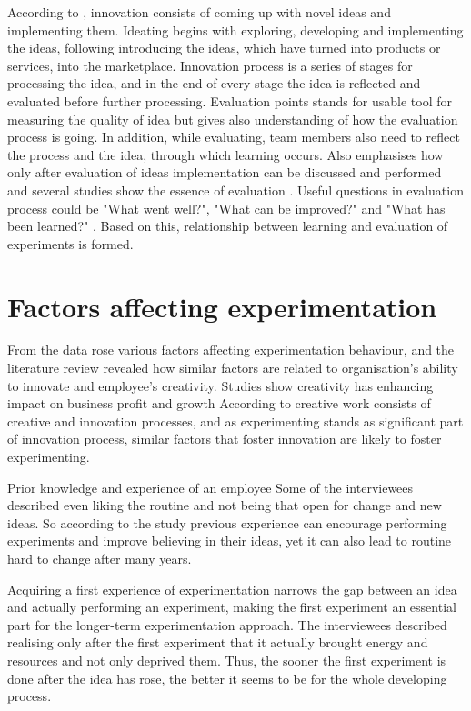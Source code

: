 According to \citet{buijs2007innovation}, innovation consists of coming up with novel ideas and implementing them. Ideating begins with exploring, developing and implementing the ideas, following introducing the ideas, which have turned into products or services, into the marketplace. Innovation process is a series of stages for processing the idea, and in the end of every stage the idea is reflected and evaluated before further processing. Evaluation points stands for usable tool for measuring the quality of idea but gives also understanding of how the evaluation process is going. In addition, while evaluating, team members also need to reflect the process and the idea, through which learning occurs. Also \citep{runco1994problem} emphasises how only after evaluation of ideas implementation can be discussed and performed and several studies show the essence of evaluation \citep{mumford2002leading,vincent2002divergent}. Useful questions in evaluation process could be "What went well?", "What can be improved?" and "What has been learned?" \citep{buijs2007innovation}. Based on this, relationship between learning and evaluation of experiments is formed. 

\section{Factors affecting experimentation} \label{fae}
From the data rose various factors affecting experimentation behaviour, and the literature review revealed how similar factors are related to organisation's ability to innovate and employee's creativity. Studies show creativity has enhancing impact on business profit and growth \citep{nystrom1990organizational} According to \citet{vincent2002divergent} creative work consists of creative and innovation processes, and as experimenting stands as significant part of innovation process, similar factors that foster innovation are likely to foster experimenting. 

Prior knowledge and experience of an employee \newline
Some of the interviewees described even liking the routine and not being that open for change and new ideas. So according to the study previous experience can encourage performing experiments and improve believing in their ideas, yet it can also lead to routine hard to change after many years. 

Acquiring a first experience of experimentation narrows the gap between an idea and actually performing an experiment, making the first experiment an essential part for the longer-term experimentation approach. The interviewees described realising only after the first experiment that it actually brought energy and resources and not only deprived them. Thus, the sooner the first experiment is done after the idea has rose, the better it seems to be for the whole developing process.

